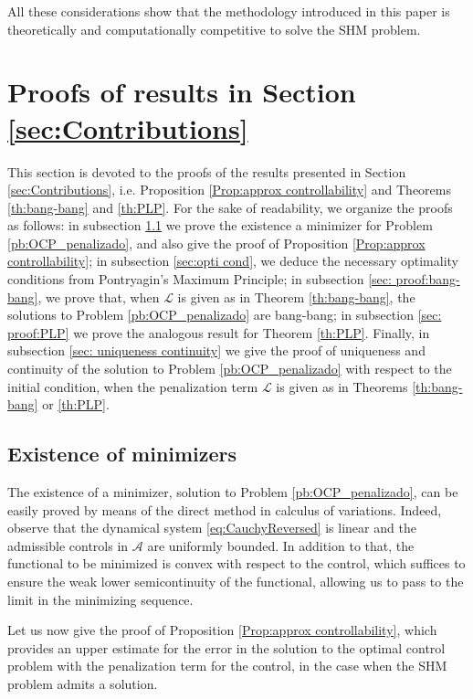 \documentclass[9pt,shortpaper,twoside,web]{ieeecolor}
\begin{document}
All these considerations show that the methodology introduced in this paper is theoretically and computationally competitive to solve the SHM problem.

\section{Proofs of results in Section \ref{sec:Contributions}}\label{sec:Proof}

This section is devoted to the proofs of the results presented in Section \ref{sec:Contributions}, i.e. Proposition \ref{Prop:approx controllability} and Theorems \ref{th:bang-bang} and \ref{th:PLP}. For the sake of readability, we organize the proofs as follows: in subsection \ref{sec: exist mini} we prove the existence a minimizer for Problem \ref{pb:OCP_penalizado}, and also give the proof of Proposition \ref{Prop:approx controllability}; in subsection \ref{sec:opti cond}, we deduce the necessary optimality conditions from Pontryagin's Maximum Principle; in subsection \ref{sec: proof:bang-bang}, we prove that, when $\mathcal{L}$ is given as in Theorem \ref{th:bang-bang}, the solutions to Problem \ref{pb:OCP_penalizado} are bang-bang; in subsection \ref{sec: proof:PLP} we prove the analogous result for Theorem \ref{th:PLP}. Finally, in subsection \ref{sec: uniqueness continuity} we give the proof of uniqueness and continuity of the solution to Problem \ref{pb:OCP_penalizado} with respect to the initial condition, when the penalization term $\mathcal{L}$ is given as in Theorems \ref{th:bang-bang} or \ref{th:PLP}.

\subsection{Existence of minimizers}\label{sec: exist mini}

The existence of a minimizer, solution to Problem \ref{pb:OCP_penalizado}, can be easily proved by means of the direct method in calculus of variations. Indeed, observe that the dynamical system \eqref{eq:CauchyReversed} is linear and the admissible controls in $\mathcal{A}$ are uniformly bounded.
In addition to that, the functional to be minimized is convex with respect to the control, which suffices to ensure the weak lower semicontinuity of the functional, allowing us to pass to the limit in the minimizing sequence.

Let us now give the proof of Proposition \ref{Prop:approx controllability}, which provides an upper estimate for the error in the solution to the optimal control problem with the penalization term for the control, in the case when the SHM problem admits a solution. 
\end{document}
